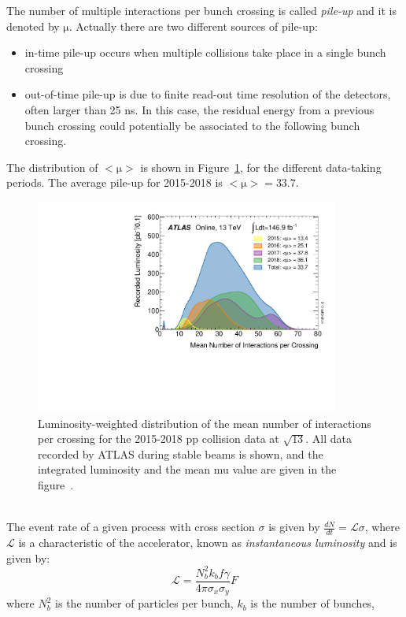 The number of multiple interactions per bunch crossing is called \textit{pile-up} and it is denoted by $\mathrm{\mu}$. 
Actually there are two different sources of pile-up:
\begin{itemize}
	\item in-time pile-up occurs when multiple collisions take place in a single bunch crossing
	\item out-of-time pile-up is due to finite read-out time resolution of the detectors, often larger than 25 ns. In this case, the residual energy from
	a previous bunch crossing could potentially be associated to the following bunch crossing.
\end{itemize}
\noindent The distribution of $\mathrm{<\mu>}$ is shown in Figure~\ref{fig:pileup}, for the different data-taking periods. The average pile-up for 2015-2018 is $\mathrm{<\mu>=33.7}$.
\begin{figure}[h]
	\centering
	\includegraphics[width=100mm]{Chapters/CH2/figures/mu_2015_2018}
	\caption{Luminosity-weighted distribution of the mean number of interactions per crossing for the 2015-2018 pp collision data at $\mathrm{\sqrt{13}}$.  All data recorded by ATLAS during stable beams is shown, and the integrated luminosity and the mean mu value are given in the figure~\cite{lumi}.}
	\label{fig:pileup}
\end{figure}
\\The event rate of a given process with cross section $\sigma$ is given by $\frac{dN}{dt}=\mathcal{L} \sigma$, where $\mathcal{L}$ is 
a characteristic of the accelerator, known as \textit{instantaneous luminosity} and is given by:
\begin{equation}
\mathcal{L} =  \frac{N^{2}_{b}k_{b}f\gamma}{4\pi\sigma_{x}\sigma_{y}}F
\end{equation}
where $N^{2}_{b}$ is the number of particles per bunch, 
$k_{b}$ is the number of bunches, 
